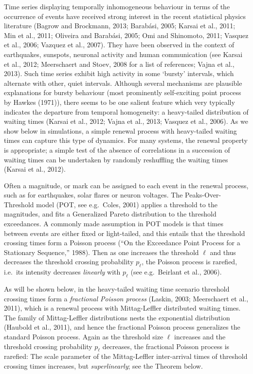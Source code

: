 \documentclass[]{elsarticle} %
\begin{document}
Time series displaying temporally inhomogeneous behaviour in terms of
the occurrence of events have received strong interest in the recent
statistical physics literature (Bagrow and Brockmann, 2013; Barabási,
2005; Karsai et al., 2011; Min et al., 2011; Oliveira and Barabási,
2005; Omi and Shinomoto, 2011; Vasquez et al., 2006; Vazquez et al.,
2007). They have been observed in the context of earthquakes, sunspots,
neuronal activity and human communication (see Karsai et al., 2012;
Meerschaert and Stoev, 2008 for a list of references; Vajna et al.,
2013). Such time series exhibit high activity in some `bursty'
intervals, which alternate with other, quiet intervals. Although several
mechanisms are plausible explanations for bursty behaviour (most
prominently self-exciting point process by Hawkes (1971)), there seems
to be one salient feature which very typically indicates the departure
from temporal homogeneity: a heavy-tailed distribution of waiting times
(Karsai et al., 2012; Vajna et al., 2013; Vasquez et al., 2006). As we
show below in simulations, a simple renewal process with heavy-tailed
waiting times can capture this type of dynamics. For many systems, the
renewal property is appropriate; a simple test of the absence of
correlations in a succession of waiting times can be undertaken by
randomly reshuffling the waiting times (Karsai et al., 2012).

Often a magnitude, or mark can be assigned to each event in the renewal
process, such as for earthquakes, solar flares or neuron voltages. The
Peaks-Over-Threshold model (POT, see e.g.~Coles, 2001) applies a
threshold to the magnitudes, and fits a Generalized Pareto distribution
to the threshold exceedances. A commonly made assumption in POT models
is that times between events are either fixed or light-tailed, and this
entails that the threshold crossing times form a Poisson process (``On
the Exceedance Point Process for a Stationary Sequence,'' 1988). Then as
one increases the threshold \(\ell\) and thus decreases the threshold
crossing probability \(p_{\ell}\), the Poisson process is rarefied,
i.e.~its intensity decreases \emph{linearly} with \(p_{\ell}\) (see
e.g.~Beirlant et al., 2006).

As will be shown below, in the heavy-tailed waiting time scenario
threshold crossing times form a \emph{fractional Poisson process}
(Laskin, 2003; Meerschaert et al., 2011), which is a renewal process
with Mittag-Leffler distributed waiting times. The family of
Mittag-Leffler distributions nests the exponential distribution (Haubold
et al., 2011), and hence the fractional Poisson process generalizes the
standard Poisson process. Again as the threshold size \(\ell\) increases
and the threshold crossing probability \(p_{\ell}\) decreases, the
fractional Poisson process is rarefied: The scale parameter of the
Mittag-Leffler inter-arrival times of threshold crossing times
increases, but \emph{superlinearly}; see the Theorem below.
\end{document}
